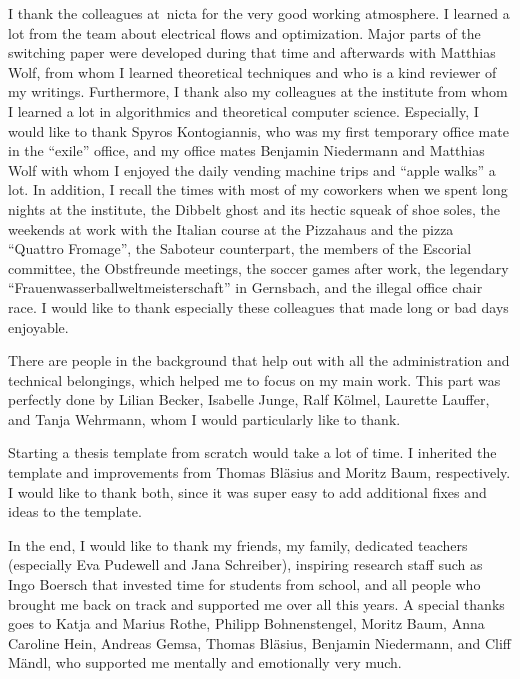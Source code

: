I thank the colleagues at~\gls{nicta} for the very good working atmosphere. I
learned a lot from the team about electrical flows and optimization. Major parts
of the switching paper were developed during that time and afterwards with
Matthias Wolf, from whom I learned theoretical techniques and who is a kind 
reviewer of my writings. Furthermore, I thank also my colleagues at the
institute from whom I learned a lot in algorithmics and theoretical computer
science. Especially, I would like to thank Spyros Kontogiannis, who was my first
temporary office mate in the ``exile'' office, and my office mates Benjamin
Niedermann and Matthias Wolf with whom I enjoyed the daily vending machine trips
and ``apple walks'' a lot. In addition, I recall the times with most of my
coworkers when we spent long nights at the institute, the Dibbelt ghost and its
hectic squeak of shoe soles, the weekends at work with the Italian course at the
Pizzahaus and the pizza ``Quattro Fromage'', the Saboteur counterpart, the
members of the Escorial committee, the Obstfreunde meetings, the soccer games
after work, the legendary ``Frauenwasserballweltmeisterschaft'' in Gernsbach,
and the illegal office chair race. I would like to thank especially these
colleagues that made long or bad days enjoyable.

There are people in the background that help out with all the administration and
technical belongings, which helped me to focus on my main work. This part was
perfectly done by Lilian Becker, Isabelle Junge, Ralf K\"olmel, Laurette
Lauffer, and Tanja Wehrmann, whom I would particularly like to thank.

Starting a thesis template from scratch would take a lot of time. I inherited
the template and improvements from Thomas Bl\"asius and Moritz Baum,
respectively. I would like to thank both, since it was super easy to add
additional fixes and ideas to the template.

In the end, I would like to thank my friends, my family, dedicated teachers
(especially Eva Pudewell and Jana Schreiber), inspiring research staff such as
Ingo Boersch that invested time for students from school, and all people who
brought me back on track and supported me over all this years. A special thanks
goes to Katja and Marius Rothe, Philipp Bohnenstengel, Moritz Baum, Anna
Caroline Hein, Andreas Gemsa, Thomas Bl\"asius, Benjamin Niedermann, and Cliff
M\"andl, who supported me mentally and emotionally very much.
% 